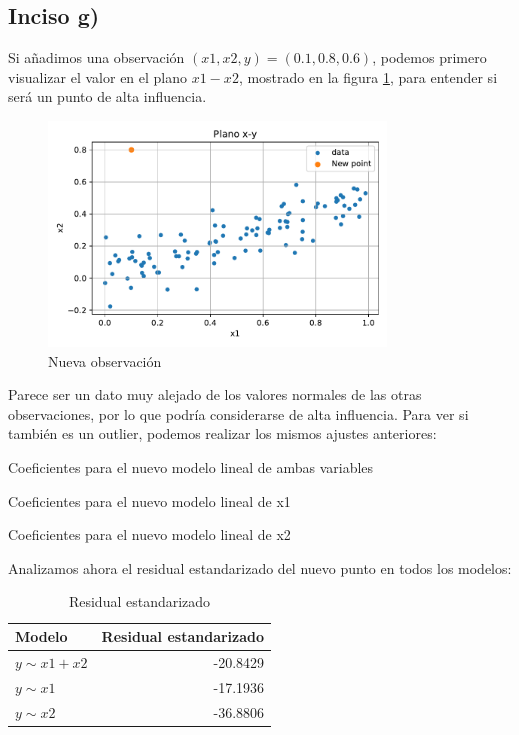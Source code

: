 \documentclass[11pt]{article}
\begin{document}
\subsection{Inciso g)}
Si añadimos una observación $(x1,x2,y) = (0.1,0.8,0.6)$, podemos primero visualizar el valor en el plano $x1-x2$, mostrado en la figura \ref{fig:2-newData}, para entender si será un punto de alta influencia.
\begin{figure}[H]
    \centering
    \includegraphics[width = 0.8\textwidth]{2-newData.pdf}
    \caption{Nueva observación}
    \label{fig:2-newData}
\end{figure}
Parece ser un dato muy alejado de los valores normales de las otras observaciones, por lo que podría considerarse de alta influencia. Para ver si también es un outlier, podemos realizar los mismos ajustes anteriores:
\begin{table}[H]
    \centering
    
    \caption{Coeficientes para el nuevo modelo lineal de ambas variables}
    \label{tab:2-newMod1}
\end{table}
\begin{table}[H]
    \centering
    
    \caption{Coeficientes para el nuevo modelo lineal de x1}
    \label{tab:2-newMod2}
\end{table}
\begin{table}[H]
    \centering
    
    \caption{Coeficientes para el nuevo modelo lineal de x2}
    \label{tab:2-newMod3}
\end{table}
Analizamos ahora el residual estandarizado del nuevo punto en todos los modelos:
\begin{table}[H]
    \centering
    \begin{tabular}{lr}
        \hline
        Modelo & Residual estandarizado \\
        \hline
        $y \sim x1 +x2$ & -20.8429 \\
        $y \sim x1 $ & -17.1936 \\
        $y \sim x2$ & -36.8806 \\
        \hline
    \end{tabular}
    \caption{Residual estandarizado}
    \label{tab:2-newMod3}
\end{table}
\end{document}
